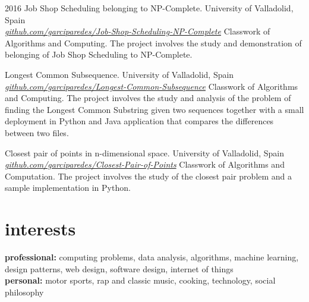 \documentclass[]{friggeri-cv} %
\begin{document}
\begin{entrylist}
  
  \entry
    {2016}
    {Job Shop Scheduling belonging to NP-Complete. }
    {University of Valladolid, Spain \\ 
    \href{https://github.com/garciparedes/Job-Shop-Scheduling-NP-Complete}{\textit{github.com/garciparedes/Job-Shop-Scheduling-NP-Complete}}}
    {Classwork of Algorithms and Computing. The project involves the study and demonstration of belonging of Job Shop Scheduling to NP-Complete.}
  
  \entry
    {}
    {Longest Common Subsequence.}
    {University of Valladolid, Spain \\
    \href{https://github.com/garciparedes/Longest-Common-Subsequence}{\textit{github.com/garciparedes/Longest-Common-Subsequence}} }
    {Classwork of Algorithms and Computing. The project involves the study and analysis of the problem of finding the Longest Common Substring given two sequences together with a small deployment in Python and Java application that compares the differences between two files.}
    
    \entry
    {}
    {Closest pair of points in n-dimensional space.}
    {University of Valladolid, Spain \\ 
    \href{https://github.com/garciparedes/Closest-Pair-of-Points}{\textit{github.com/garciparedes/Closest-Pair-of-Points}}}
    {Classwork of Algorithms and Computation. The project involves the study of the closest pair problem and a sample implementation in Python.}

\end{entrylist}

\section{interests}

\textbf{professional:} computing problems, data analysis, algorithms, machine learning, design patterns, web design, software design, internet of things \\
\textbf{personal:} motor sports, rap and classic music, cooking, technology, social philosophy
\end{document}
